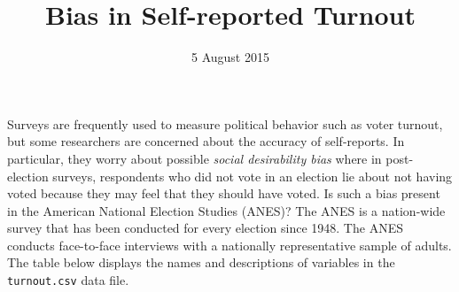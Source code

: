 \documentclass[]{article}
\title{Bias in Self-reported Turnout}
\author{}
\date{5 August 2015}
\begin{document}
\maketitle


Surveys are frequently used to measure political behavior such as voter
turnout, but some researchers are concerned about the accuracy of
self-reports. In particular, they worry about possible \emph{social
desirability bias} where in post-election surveys, respondents who did
not vote in an election lie about not having voted because they may feel
that they should have voted. Is such a bias present in the American
National Election Studies (ANES)? The ANES is a nation-wide survey that
has been conducted for every election since 1948. The ANES conducts
face-to-face interviews with a nationally representative sample of
adults. The table below displays the names and descriptions of variables
in the \texttt{turnout.csv} data file.
\end{document}
